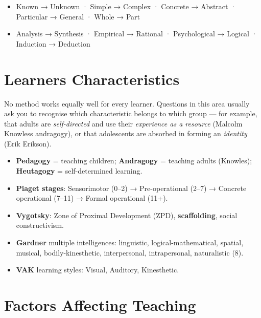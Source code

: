 \begin{itemize}
\tightlist
\item
  Known → Unknown · Simple → Complex · Concrete → Abstract · Particular → General · Whole → Part
\item
  Analysis → Synthesis · Empirical → Rational · Psychological → Logical · Induction → Deduction
\end{itemize}

\needspace{125pt}

\hypertarget{p1-01--2-learners-characteristics}{%
\section{Learner\textquotesingle s Characteristics}\label{p1-01--2-learners-characteristics}}

No method works equally well for every learner. Questions in this area usually ask you to recognise which
characteristic belongs to which group --- for example, that adults are \emph{self-directed} and use their
\emph{experience as a resource} (Malcolm Knowles\textquotesingle s andragogy), or that adolescents are absorbed in forming an
\emph{identity} (Erik Erikson).



\begin{itemize}
\tightlist
\item
  \textbf{Pedagogy} = teaching children; \textbf{Andragogy} = teaching adults (Knowles); \textbf{Heutagogy} = self-determined learning.
\item
  \textbf{Piaget stages}: Sensorimotor (0--2) → Pre-operational (2--7) → Concrete operational (7--11) → Formal operational (11+).
\item
  \textbf{Vygotsky}: Zone of Proximal Development (ZPD), \textbf{scaffolding}, social constructivism.
\item
  \textbf{Gardner} multiple intelligences: linguistic, logical-mathematical, spatial, musical, bodily-kinesthetic, interpersonal, intrapersonal, naturalistic (8).
\item
  \textbf{VAK} learning styles: Visual, Auditory, Kinesthetic.
\end{itemize}

\needspace{160pt}

\hypertarget{p1-01--3-factors-affecting-teaching}{%
\section{Factors Affecting Teaching}\label{p1-01--3-factors-affecting-teaching}}

